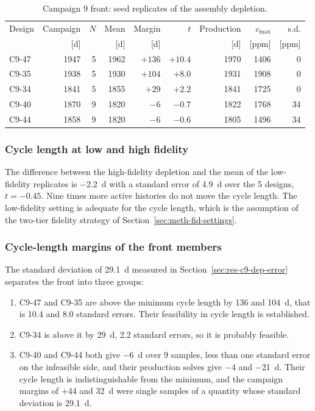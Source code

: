 \begin{table}[htbp]
  \centering
  \small
  \caption{Campaign 9 front: seed replicates of the assembly depletion.}
  \label{tab:c9-dep-replicas}
  \begin{tabular}{@{}lrrrrrrrr@{}}
    \toprule
    Design & Campaign & $N$ & Mean & Margin & $t$ & Production & $c_\mathrm{max}$ & s.d. \\
     & [d] & & [d] & [d] & & [d] & [ppm] & [ppm] \\
    \midrule
    C9-47 & 1947 & 5 & 1962 & $+136$ & $+10.4$ & 1970 & 1406 & 0 \\
    C9-35 & 1938 & 5 & 1930 & $+104$ & $+8.0$  & 1931 & 1908 & 0 \\
    C9-34 & 1841 & 5 & 1855 & $+29$  & $+2.2$  & 1841 & 1725 & 0 \\
    C9-40 & 1870 & 9 & 1820 & $-6$   & $-0.7$  & 1822 & 1768 & 34 \\
    C9-44 & 1858 & 9 & 1820 & $-6$   & $-0.6$  & 1805 & 1496 & 34 \\
    \bottomrule
  \end{tabular}
\end{table}

\subsubsection{Cycle length at low and high fidelity}
\label{sec:res-c9-dep-tiers}
The difference between the high-fidelity depletion and the mean of the
low-fidelity replicates is \SI{-2.2}{d} with a standard error of \SI{4.9}{d} over the 5
designs, $t = -0.45$. Nine times more active histories do not move the
cycle length. The low-fidelity setting is adequate for the cycle length,
which is the assumption of the two-tier fidelity strategy of
Section~\ref{sec:meth-fid-settings}.

\subsubsection{Cycle-length margins of the front members}
\label{sec:res-c9-dep-margins}
The standard deviation of \SI{29.1}{d} measured in
Section~\ref{sec:res-c9-dep-error} separates the front into three
groups:

\begin{enumerate}
  \item C9-47 and C9-35 are above the minimum cycle length by 136 and
        \SI{104}{d}, that is 10.4 and 8.0 standard errors. Their
        feasibility in cycle length is established.

  \item C9-34 is above it by \SI{29}{d}, 2.2 standard errors, so it is
        probably feasible.

  \item C9-40 and C9-44 both give \SI{-6}{d} over 9 samples, less than
        one standard error on the infeasible side, and their production
        solves give $-4$ and \SI{-21}{d}. Their cycle length is
        indistinguishable from the minimum, and the campaign margins of $+44$ and \SI{+32}{d} were single samples of a quantity whose
        standard deviation is \SI{29.1}{d}.
\end{enumerate}

